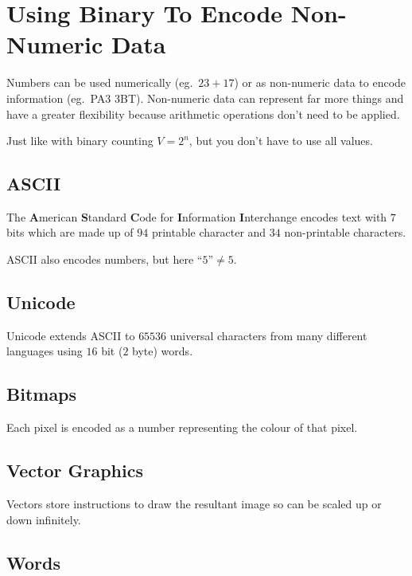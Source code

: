 \section{Using Binary To Encode Non-Numeric Data}\label{sec:using_binary_to_encode_non_numeric_data}

Numbers can be used numerically (eg.\ \(23 + 17\)) or as non-numeric data to encode information (eg.\ PA3 3BT).
Non-numeric data can represent far more things and have a greater flexibility because arithmetic operations don't need to be applied.

Just like with binary counting \(V=2^n\), but you don't have to use all values.

\subsection{ASCII}\label{sub:ascii}

The \textbf{A}merican \textbf{S}tandard \textbf{C}ode for \textbf{I}nformation \textbf{I}nterchange encodes text with \(7\) bits which are made up of \(94\) printable character and \(34\) non-printable characters.

\begin{note}
    ASCII also encodes numbers, but here \(\textrm{``5''} \neq 5\).
\end{note}

\subsection{Unicode}\label{sub:unicode}

Unicode extends ASCII to \(65536\) universal characters from many different languages using \(16\) bit (\(2\) byte) words.

\subsection{Bitmaps}\label{sub:bitmaps}

Each pixel is encoded as a number representing the colour of that pixel.

\subsection{Vector Graphics}\label{sub:vector_graphics}

Vectors store instructions to draw the resultant image so can be scaled up or down infinitely.

\subsection{Words}\label{sub:words}

